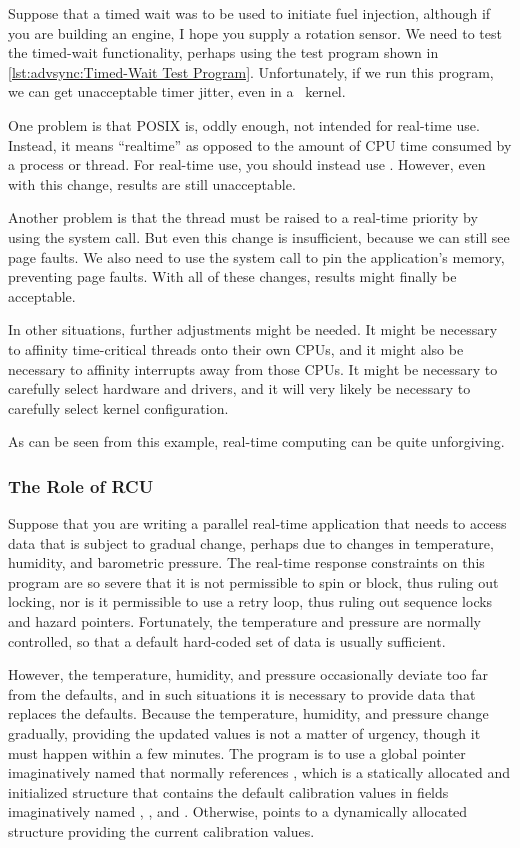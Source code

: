 Suppose that a timed wait was to be used to initiate fuel injection,
although if you are building an engine, I hope you supply a rotation
sensor.
We need to test the timed-wait functionality, perhaps using the test program
shown in
\cref{lst:advsync:Timed-Wait Test Program}.
Unfortunately, if we run this program, we can get unacceptable timer
jitter, even in a \rt\ kernel.

One problem is that POSIX  is, oddly enough, not intended
for real-time use.
Instead, it means ``realtime'' as opposed to the amount of CPU time
consumed by a process or thread.
For real-time use, you should instead use .
However, even with this change, results are still unacceptable.

Another problem is that the thread must be raised to a real-time
priority by using the  system call.
But even this change is insufficient, because we can still see
page faults.
We also need to use the  system call to pin the
application's memory, preventing page faults.
With all of these changes, results might finally be acceptable.

In other situations, further adjustments might be needed.
It might be necessary to affinity time-critical threads onto their
own CPUs, and it might also be necessary to affinity interrupts
away from those CPUs.
It might be necessary to carefully select hardware and drivers,
and it will very likely be necessary to carefully select kernel
configuration.

As can be seen from this example, real-time computing can be quite
unforgiving.

\subsubsection{The Role of RCU}
\label{sec:advsync:The Role of RCU}

Suppose that you are writing a parallel real-time application that needs
to access
data that is subject to gradual change, perhaps due to changes in
temperature, humidity, and barometric pressure.
The real-time response constraints on this program are so severe that
it is not permissible to spin or block, thus ruling out locking,
nor is it permissible to use a retry loop, thus ruling out sequence locks
and hazard pointers.
Fortunately, the temperature and pressure are normally controlled,
so that a default hard-coded set of data is usually sufficient.

However, the temperature, humidity, and pressure occasionally deviate too far
from the defaults, and in such situations it is necessary to provide
data that replaces the defaults.
Because the temperature, humidity, and pressure change gradually,
providing the updated values is not a matter of urgency, though
it must happen within a few minutes.
The program is to use a global pointer imaginatively named 
that normally references , which is a statically allocated
and initialized structure that contains the default calibration values
in fields imaginatively named , , and .
Otherwise,  points to a dynamically allocated
structure providing the current calibration values.

